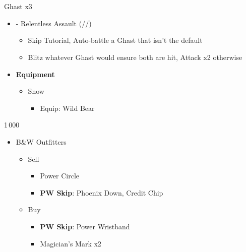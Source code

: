 \chapter[Chapter 3]{}

\renewcommand{\first}{[1] - Relentless Assault (\com/\rav/\rav)}
\begin{multicols}{2}

\begin{battle}{Ghast x3}
\begin{itemize}
    \item \first
    \begin{itemize}
        \item Skip Tutorial, Auto-battle a Ghast that isn't the default
        \item Blitz whatever Ghast would ensure both are hit, Attack x2 otherwise
    \end{itemize}
\end{itemize}
\end{battle}
\begin{menu}
\begin{itemize}
    \item \textbf{Equipment}
    \begin{itemize}
        \item Snow
        \begin{itemize}
            \item Equip: Wild Bear
        \end{itemize}
    \end{itemize}
\end{itemize}
\end{menu}
\begin{shop}{1\,000}
\begin{itemize}
    \item B\&W Outfitters
    \begin{itemize}
        \item Sell
        \begin{itemize}
            \item Power Circle
            \item {\bf PW Skip}: Phoenix Down, Credit Chip
        \end{itemize}
        \item Buy
        \begin{itemize}
            \item {\bf PW Skip}: Power Wristband
            \item Magician's Mark x2
        \end{itemize}

\end{itemize}
\end{itemize}
\end{shop}
\end{multicols}

